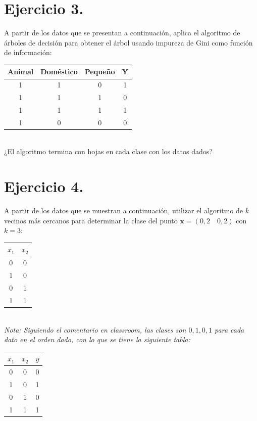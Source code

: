 \documentclass[12pt,letterpaper]{article}
\begin{document}
\section{Ejercicio 3.}
A partir de los datos que se presentan a continuación, aplica el algoritmo de árboles de decisión para obtener el árbol usando impureza de Gini como función de información:\\
\begin{table}[h!]
  \centering
  \begin{tabular}{ccc|c}
    \toprule
    Animal & Doméstico & Pequeño & \textbf{Y} \\
    \midrule
    1 & 1 & 0 & 1 \\
    1 & 1 & 1 & 0 \\
    1 & 1 & 1 & 1 \\
    1 & 0 & 0 & 0 \\
    \bottomrule
  \end{tabular}
\end{table}
\\
¿El algoritmo termina con hojas en cada clase con los datos dados?

\bigskip



\newpage

\section{Ejercicio 4.}
A partir de los datos que se muestran a continuación, utilizar el algoritmo de $k$ vecinos más cercanos para determinar la clase del punto $\mathbf{x} = (0,2 \quad 0,2)$ con $k = 3$:
\begin{table}[h!]
  \centering
  \begin{tabular}{cc}
    \toprule
    $x_1$ & $x_2$ \\
    \midrule
    0 & 0 \\
    1 & 0 \\
    0 & 1 \\
    1 & 1 \\
    \bottomrule
  \end{tabular}
\end{table}
\\
\emph{Nota: Siguiendo el comentario en classroom, las clases son $0,1,0,1$ para cada dato en el orden dado, con lo que se tiene la siguiente tabla:}
\begin{table}[h!]
  \centering
  \begin{tabular}{cc|c}
    \toprule
    $x_1$ & $x_2$ & $y$\\
    \midrule
    0 & 0 & 0\\
    1 & 0 & 1\\
    0 & 1 & 0\\
    1 & 1 & 1\\
    \bottomrule
  \end{tabular}
\end{table}
\end{document}
